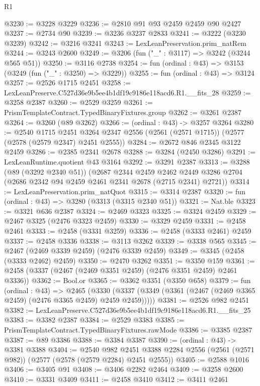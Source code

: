 \begin{lexlean}{R1}
\begin{coremodule}
@3230 := @3228 @3229
@3236 := @2810 @91 @93 @2459 @2459 @90 @2427
@3237 := @2734 @90
@3239 := @3236 @3237 @2833
@3241 := @3222 (@3230 @3239)
@3242 := @3216 @3241
@3243 := LexLeanPreservation.prim_natRem
@3244 := @3243 @2600
@3249 := @3206 (fun ("_" : @3117) => @3242 (@3244 @565 @51))
@3250 := @3116 @2738
@3254 := fun (ordinal : @43) => @3153 (@3249 (fun ("_" : @3250) => @3229))
@3255 := fun (ordinal : @43) => @3124
@3257 := @2526 @1715 @2451
@3258 := LexLeanPreserve.C527d36e9b5ee4b1df19c9186e118acd6.R1.__fits_28
@3259 := @3258 @2387
@3260 := @2529 @3259
@3261 := PrismTemplateContract.TypedBinaryFixtures.group
@3262 := @3261 @2387
@3264 := @3260 (@89 @3262)
@3266 := (ordinal : @43) -> @3257 @3264
@3280 := @2540
    @1715
    @2451
    @3264
    @2347
    @2556
    (@2561 (@2571 @1715))
    (@2577 (@2578 (@2579 @2347) @2451 @2555))
@3284 := @2672 @846 @2345 @3122 @2459
@3286 := @2385 @2341 @2678
@3288 := @3284 (@2450 @3286)
@3291 := LexLeanRuntime.quotient @43 @3164
@3292 := @3291 @2387
@3313 := @3288
    (@89 (@3292 @2340 @51))
    (@2687
      @2344
      @2459
      @2462
      @2449
      @3286
      @2704
      (@2686 @2342 @94 @2459 @2461 @2341 @2678 (@2715 @2341) @2721))
@3314 := LexLeanPreservation.prim_natQuot
@3315 := @3314 @2387
@3320 := fun (ordinal : @43) => @3280 (@3313 (@3315 @2340 @51))
@3321 := Nat.ble
@3323 := @3321 @636 @2387
@3324 := @2469 @3323
@3325 := @3324 @2459
@3329 := @2467 @3325 (@2476 @3323 @2459)
@3330 := @3329 @2459
@3331 := @2458 @2461
@3333 := @2458 (@3331 @3259)
@3336 := @2458 (@3333 @2461) @2459
@3337 := @2458 @3336
@3338 := @3113 @3262
@3339 := @3338 @565
@3345 := @2467 (@2469 @3339 @2459) (@2476 @3339 @2459)
@3349 := @3345 (@2458 (@3333 @2462) @2459)
@3350 := @2470 @3262
@3351 := @3350 @159
@3361 := @2458 (@3337 (@2467 (@2469 @3351 @2459) (@2476 @3351 @2459) @2461 @3336))
@3362 := Bool.or
@3365 := @3362 @3351 (@3350 @658)
@3379 := fun (ordinal : @43) =>
  @2465 (@3330 (@3337 (@3349 (@3361 (@2467 (@2469 @3365 @2459) (@2476 @3365 @2459) @2459 @2459)))))
@3381 := @2526 @982 @2451
@3382 := LexLeanPreserve.C527d36e9b5ee4b1df19c9186e118acd6.R1.__fits_25
@3383 := @3382 @2387
@3384 := @2529 @3383
@3385 := PrismTemplateContract.TypedBinaryFixtures.rawMode
@3386 := @3385 @2387
@3387 := @89 @3386
@3388 := @3384 @3387
@3390 := (ordinal : @43) -> @3381 @3388
@3404 := @2540
    @982
    @2451
    @3388
    @2284
    @2556
    (@2561 (@2571 @982))
    (@2577 (@2578 (@2579 @2284) @2451 @2555))
@3405 := @2588 @1016
@3406 := @3405 @91
@3408 := @3406 @2282 @2464
@3409 := @3258 @2600
@3410 := @3331 @3409
@3411 := @2458 @3410
@3412 := @3411 @2461

\end{coremodule}
\end{lexlean}
